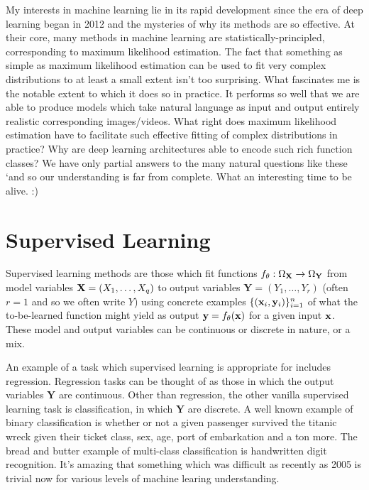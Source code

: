 \documentclass[11pt]{article}
\begin{document}
\noindent My interests in machine learning lie in its rapid development since the era of deep learning began in 2012 and the mysteries of why its methods are so effective. At their core, many methods in machine learning are statistically-principled, corresponding to maximum likelihood estimation. The fact that something as simple as maximum likelihood estimation can be used to fit very complex distributions to at least a small extent isn't too surprising. What fascinates me is the notable extent to which it does so in practice. It performs so well that we are able to produce models which take natural language as input and output entirely realistic corresponding images/videos. What right does maximum likelihood estimation have to facilitate such effective fitting of complex distributions in practice? Why are deep learning architectures able to encode such rich function classes? We have only partial answers to the many natural questions like these `and so our understanding is far from complete. What an interesting time to be alive. :)

\section{Supervised Learning}
Supervised learning methods are those which fit functions $f_{\theta}:\Omega_{\mathbf{X}}\to\Omega_{\mathbf{Y}}$ from model variables $\mathbf{X}=(X_1,\dots,X_q)$ to output variables $\mathbf{Y}=(Y_1,\dots,Y_r)$ (often $r=1$ and so we often write $Y$) using concrete examples $\{(\mathbf{x}_i,\mathbf{y}_i)\}_{i=1}^n$ of what the to-be-learned function might yield as output $\mathbf{y}=f_{\theta}(\mathbf{x})$ for a given input $\mathbf{x}$. These model and output variables can be continuous or discrete in nature, or a mix.

An example of a task which supervised learning is appropriate for includes regression. Regression tasks can be thought of as those in which the output variables $\mathbf{Y}$ are continuous. Other than regression, the other vanilla supervised learning task is classification, in which $\mathbf{Y}$ are discrete. A well known example of binary classification is whether or not a given passenger survived the titanic wreck given their ticket class, sex, age, port of embarkation and a ton more. The bread and butter example of multi-class classification is handwritten digit recognition. It's amazing that something which was difficult as recently as 2005 is trivial now for various levels of machine learing understanding.
\end{document}
